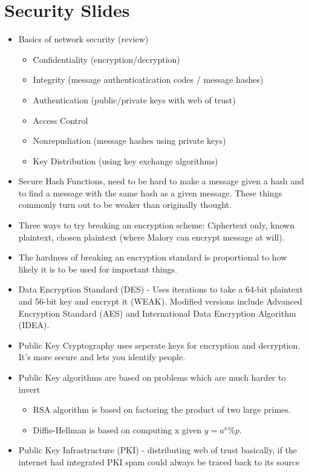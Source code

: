 \documentclass{scrartcl}
\begin{document}
\section*{Security Slides}
\begin{itemize}
\item Basics of network security (review)
\begin{itemize}
\item Confidentiality (encryption/decryption)
\item Integrity (message authenticatication codes / message hashes)
\item Authentication (public/private keys with web of trust)
\item Access Control 
\item Nonrepudiation (message hashes using private keys)
\item Key Distribution (using key exchange algorithms)
\end{itemize}
\item Secure Hash Functions, need to be hard to make a message given a hash
and to find a message with the same hash as a given message. These things
commonly turn out to be weaker than originally thought.
\item Three ways to try breaking an encryption scheme: Ciphertext only, 
known plaintext, chosen plaintext (where Malory can encrypt message at will).
\item The hardness of breaking an encryption standard is proportional
to how likely it is to be used for important things.
\item Data Encryption Standard (DES) - Uses iterations to take a 64-bit
plaintext and 56-bit key and encrypt it (WEAK). Modified versions include
Advanced Encryption Standard (AES) and International Data Encryption
Algorithm (IDEA).
\item Public Key Cryptography uses seperate keys for encryption and decryption.
It's more secure and lets you identify people.
\item Public Key algorithms are based on problems which are much harder to
invert
\begin{itemize}
\item RSA algorithm is based on factoring the product of two large primes.
\item Diffie-Hellman is based on computing x given $y=a^{x}\%p$.
\end{itemize}
\item Public Key Infrastructure (PKI) - distributing web of trust basically, if
the internet had integrated PKI spam could always be traced back to its source

\end{itemize}
\end{document}
